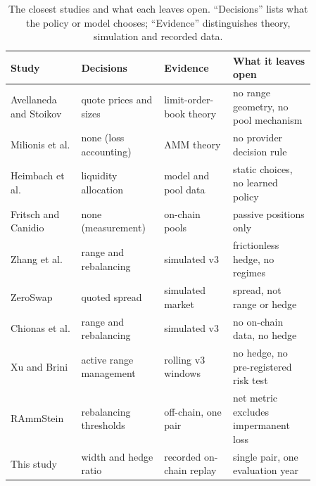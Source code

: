\begin{table}[tbp]
\caption{The closest studies and what each leaves open. ``Decisions'' lists
what the policy or model chooses; ``Evidence'' distinguishes theory,
simulation and recorded data.}
\label{tab:gap}
\centering
\footnotesize
\begin{tabular}{@{}L{0.20\linewidth}L{0.22\linewidth}L{0.20\linewidth}L{0.24\linewidth}@{}}
\toprule
\textbf{Study} & \textbf{Decisions} & \textbf{Evidence} & \textbf{What it leaves open} \\
\midrule
Avellaneda and Stoikov\cite{avellaneda2008high} & quote prices and sizes & limit-order-book theory & no range geometry, no pool mechanism \\
Milionis et al.\cite{milionis2022lvr,milionis2023fees} & none (loss accounting) & AMM theory & no provider decision rule \\
Heimbach et al.\cite{heimbach2022risks} & liquidity allocation & model and pool data & static choices, no learned policy \\
Fritsch and Canidio\cite{fritsch2024measuring} & none (measurement) & on-chain pools & passive positions only \\
Zhang et al.\cite{zhang2023adaptive} & range and rebalancing & simulated v3 & frictionless hedge, no regimes \\
ZeroSwap\cite{nadkarni2023zeroswap} & quoted spread & simulated market & spread, not range or hedge \\
Chionas et al.\cite{chionas2026concentrated} & range and rebalancing & simulated v3 & no on-chain data, no hedge \\
Xu and Brini\cite{xu2025improving} & active range management & rolling v3 windows & no hedge, no pre-registered risk test \\
RAmmStein\cite{anchuri2026rammstein} & rebalancing thresholds & off-chain, one pair & net metric excludes impermanent loss \\
This study & width and hedge ratio & recorded on-chain replay & single pair, one evaluation year \\
\bottomrule
\end{tabular}
\end{table}
